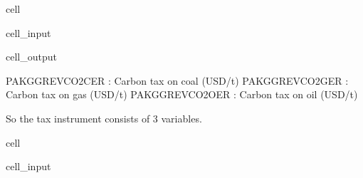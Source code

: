 \documentclass[letterpaper,10pt,english]{jupyterBook}
\begin{document}
\begin{sphinxuseclass}{cell}\begin{sphinxVerbatimInput}

\begin{sphinxuseclass}{cell_input}
\begin{sphinxVerbatim}[commandchars=\\\{\}]
   \PYG{p}{[}   \PYG{p}{]}
    \PYG{p}{[}\PYG{p}{]}
    
\end{sphinxVerbatim}

\end{sphinxuseclass}\end{sphinxVerbatimInput}
\begin{sphinxVerbatimOutput}

\begin{sphinxuseclass}{cell_output}
\begin{sphinxVerbatim}[commandchars=\\\{\}]
PAKGGREVCO2CER : Carbon tax on coal (USD/t)
PAKGGREVCO2GER : Carbon tax on gas (USD/t)
PAKGGREVCO2OER : Carbon tax on oil (USD/t)
\end{sphinxVerbatim}

\end{sphinxuseclass}\end{sphinxVerbatimOutput}

\end{sphinxuseclass}
\sphinxAtStartPar
So the tax instrument consists of 3 variables.

\begin{sphinxuseclass}{cell}\begin{sphinxVerbatimInput}

\begin{sphinxuseclass}{cell_input}
\begin{sphinxVerbatim}[commandchars=\\\{\}]
  \PYG{p}{[}\PYG{p}{]}
  \PYG{p}{[}\PYG{p}{[} \PYG{p}{]}\PYG{p}{]}
\end{sphinxVerbatim}

\end{sphinxuseclass}\end{sphinxVerbatimInput}

\end{sphinxuseclass}
\end{document}
